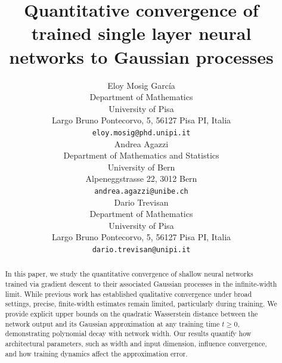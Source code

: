 \documentclass{article}
\title{Quantitative convergence of trained single layer neural networks to Gaussian processes}
\author{%
Eloy Mosig García\\
  Department of Mathematics\\
  University of Pisa\\
  Largo Bruno Pontecorvo, 5, 56127 Pisa PI, Italia\\
  \texttt{eloy.mosig@phd.unipi.it}\\
  \And
Andrea Agazzi\\
Department of Mathematics and Statistics\\
University of Bern\\
Alpeneggstrasse 22, 3012 Bern\\
\texttt{andrea.agazzi@unibe.ch}\\
  \And
  Dario Trevisan\\
  Department of Mathematics\\
  University of Pisa\\
  Largo Bruno Pontecorvo, 5, 56127 Pisa PI, Italia\\
  \texttt{dario.trevisan@unipi.it}\\
}
\theoremstyle{definition}
\theoremstyle{remark}
\numberwithin{equation}{section}
\begin{document}
\maketitle

\begin{abstract}

    In this paper, we study the quantitative convergence of shallow neural networks trained via gradient descent to their associated Gaussian processes in the infinite-width limit. 
    While previous work has established qualitative convergence under broad settings, precise, finite-width estimates remain limited, particularly during training. 
    We provide explicit upper bounds on the quadratic Wasserstein distance between the network output and its Gaussian approximation at any training time $t \ge 0$, demonstrating polynomial decay with network width. 
    Our results quantify how architectural parameters, such as width and input dimension, influence convergence, and how training dynamics affect the approximation error.

\end{abstract}
\end{document}
